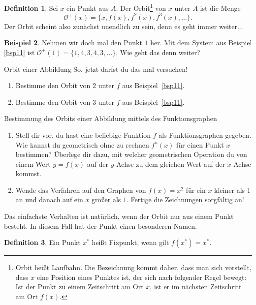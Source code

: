 \documentclass[a4paper,ngerman,12pt]{zirkelblatt1415}
\theoremstyle{definition}
\newtheorem{definition}{Definition}
\newtheorem{beispiel}[definition]{Beispiel}
\theoremstyle{remark}
\begin{document}
\begin{definition}
Sei $x$ ein Punkt aus $A$. Der Orbit\footnote{Orbit heißt Laufbahn. Die Bezeichnung kommt daher, dass man sich vorstellt, 
dass $x$ eine Position eines Punktes ist, der sich nach folgender Regel bewegt: 
Ist der Punkt zu einem Zeitschritt am Ort $x$, ist er im nächsten Zeitschritt am Ort $f(x)$.} 
von $x$ unter $A$ ist die Menge
\[
\mathcal{O}^+(x) = \{x, f(x), f^2(x), f^3(x) ,\ldots\}.
\]
Der Orbit scheint also zunächst unendlich zu sein, denn es geht immer weiter... 
\end{definition}


\begin{beispiel}
Nehmen wir doch mal den Punkt $1$ her.
Mit dem System aus Beispiel \ref{bsp11} ist $\mathcal{O}^+(1) = \{1,4,3,4,3,\ldots\}$.
Wie geht das denn weiter?
\end{beispiel}



\begin{aufgabe}{Orbit einer Abbildung}
  So, jetzt darfst du das mal versuchen! 
  \begin{enumerate}
    \item Bestimme den Orbit von $2$ unter $f$ aus Beispiel~\ref{bsp11}.
    \item Bestimme den Orbit von $3$ unter $f$ aus Beispiel~\ref{bsp11}.
  \end{enumerate}
\end{aufgabe}

\begin{aufgabe}{Bestimmung des Orbits einer Abbildung mittels des Funktionsgraphen}
  \begin{enumerate}
    \item Stell dir vor, du hast eine beliebige Funktion $f$ als Funktionsgraphen gegeben. Wie kannst du geometrisch ohne zu rechnen $f^n(x)$ für einen Punkt $x$ bestimmen? Überlege dir dazu, mit welcher geometrischen Operation du von einem Wert $y=f(x)$ auf der $y$-Achse zu dem gleichen Wert auf der $x$-Achse kommst.
    \item Wende das Verfahren auf den Graphen von $f(x)=x^2$ für ein $x$ kleiner als $1$ an und danach auf ein $x$ größer als $1$. Fertige die Zeichnungen sorgfältig an!
  \end{enumerate}
\end{aufgabe}


Das einfachste Verhalten ist natürlich, wenn der Orbit nur aus einem Punkt besteht.
In diesem Fall hat der Punkt einen besonderen Namen.
\begin{definition}
Ein Punkt $x^{*}$ heißt Fixpunkt, wenn gilt $f(x^{*}) =x^{*}$.
\end{definition}
\end{document}
